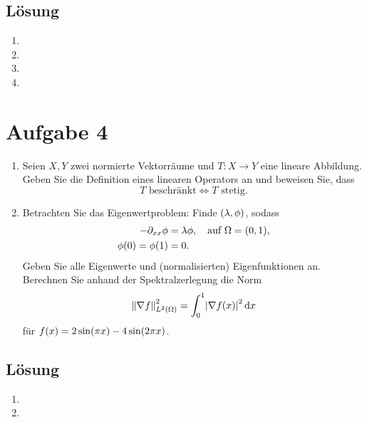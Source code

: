 \documentclass{exercise}
\begin{document}
    \subsection*{Lösung}
    \begin{enumerate}
        \item
        \item
        \item
        \item
    \end{enumerate}


    \section*{Aufgabe 4}
    
    \begin{problem}
        \begin{enumerate}
            \item Seien \(X, Y\) zwei normierte Vektorräume und \(T: X \to Y\) eine lineare Abbildung.
            Geben Sie die Definition eines linearen Operators an und beweisen Sie, dass
            \[
                T\text{ beschränkt} \iff T\text{ stetig}.
            \]
            \item Betrachten Sie das Eigenwertproblem: Finde \(\parentheses*{\lambda, \phi}\), sodass
            \begin{align*}
                -\partial_{xx}\phi &= \lambda\phi, \quad \text{auf }\Omega = \parentheses*{0, 1},\\
                \phi\parentheses*{0} = \phi\parentheses*{1} &= 0.
            \end{align*}
            Geben Sie alle Eigenwerte und (normalisierten) Eigenfunktionen an.
            Berechnen Sie anhand der Spektralzerlegung die Norm
            \[
                \norm*{\nabla f}_{L^2\parentheses*{\Omega}}^2 = \int_0^1 \absolute*{\nabla f\parentheses*{x}}^2 \d x
            \]
            für \(f\parentheses*{x} = 2\sin\parentheses*{\pi x} - 4\sin\parentheses*{2\pi x}\).
        \end{enumerate}
    \end{problem}
    
    \subsection*{Lösung}
    \begin{enumerate}
        \item
        \item
    \end{enumerate}
\end{document}
